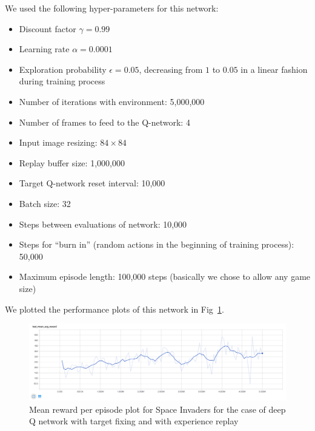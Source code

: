 \documentclass{article}
\begin{document}
We used the following hyper-parameters for this network:
\begin{itemize}
  \item Discount factor $\gamma=0.99$
  \item Learning rate $\alpha=0.0001$
  \item Exploration probability $\epsilon=0.05$, decreasing from $1$ to $0.05$ in a linear fashion during training process
  \item Number of iterations with environment: 5,000,000
  \item Number of frames to feed to the Q-network: 4
  \item Input image resizing: $84\times84$
  \item Replay buffer size: 1,000,000
  \item Target Q-network reset interval: 10,000
  \item Batch size: 32
  \item Steps between evaluations of network: 10,000
  \item Steps for ``burn in'' (random actions in the beginning of training process): 50,000
  \item Maximum episode length: 100,000 steps (basically we chose to allow any game size)
\end{itemize}

We plotted the performance plots of this network in Fig~\ref{fig:r_q5}.


\begin{figure}[h]
  \label{fig:r_q5} 
  \centering
  \includegraphics[width=1.0\textwidth]{images/r_q5}
  \caption{Mean reward per episode plot for Space Invaders for the case of deep Q network with target fixing and with experience replay}
\end{figure}
\end{document}
